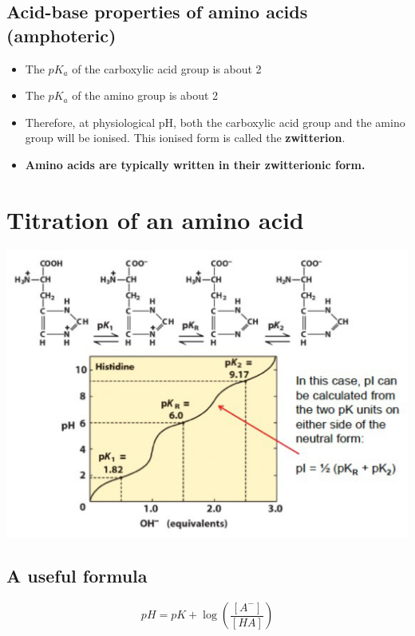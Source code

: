 \documentclass[11pt]{article}
\begin{document}
\subsection{Acid-base properties of amino acids (amphoteric)}
\label{sec:org8a7736e}
\begin{itemize}
\item The \(pK_a\) of the carboxylic acid group is about 2
\item The \(pK_a\) of the amino group is about 2
\item Therefore, at physiological pH, both the carboxylic acid group and the amino group will be ionised. This ionised form is called the \textbf{zwitterion}.
\item \textbf{Amino acids are typically written in their zwitterionic form.}
\end{itemize}


\section{Titration of an amino acid}
\label{sec:org6409f1f}
\begin{center}
\includegraphics[width=.9\linewidth]{./images/titration-of-an-amino-acid.png}
\end{center}

\subsection{A useful formula}
\label{sec:org3cf312c}
\[pH = pK + \log \left( \frac{[A^-]}{[HA]}\right)\]
\end{document}
